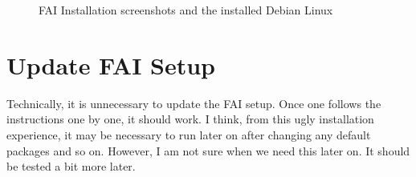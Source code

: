 \documentclass[11pt
  , a4paper
  , article
  , oneside
]{memoir}
\begin{document}
\begin{figure}[!htb]
{	      \label{fig:f-3}
	    }
            \hfill
  \caption
      {
        FAI Installation screenshots and the installed Debian Linux
      }
 \label{fig:gnomehost}
\end{figure}


\section{Update FAI Setup}
Technically, it is unnecessary to update the FAI setup. Once one follows the instructions one by one, it should work. I think, from this ugly installation experience, it may be necessary to run later on after changing any default packages and so on. However, I am not sure when we need this later on. It should be tested a bit more later. 
\end{document}

